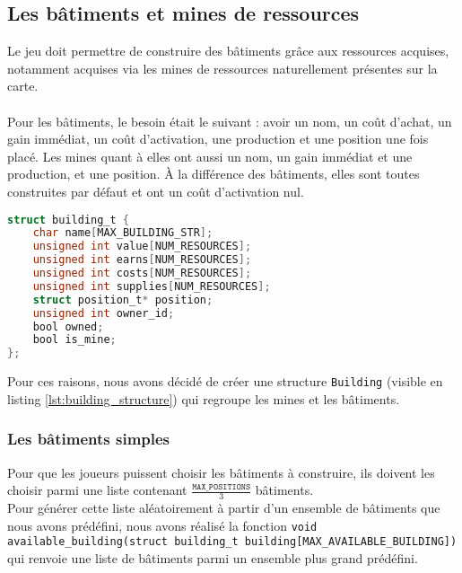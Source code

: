 \subsection*{Les bâtiments et mines de ressources}
Le jeu doit permettre de construire des bâtiments grâce aux ressources acquises, notamment acquises via les mines de ressources naturellement présentes sur la carte.\\ \\
Pour les bâtiments, le besoin était le suivant : avoir un nom, un coût d'achat, un gain immédiat, un coût d'activation, une production et une position une fois placé.
Les mines quant à elles ont aussi un nom, un gain immédiat et une production, et une position.
À la différence des bâtiments, elles sont toutes construites par défaut et ont un coût d'activation nul.
\begin{lstlisting}[language=C, backgroundcolor=\color{black!5}, frame=single, frameround=tttt, basicstyle=\ttfamily, breaklines=true, keywordstyle=\color{blue}, commentstyle=\color{green!50!black}, stringstyle=\color{red}]
struct building_t {
    char name[MAX_BUILDING_STR];
    unsigned int value[NUM_RESOURCES];
    unsigned int earns[NUM_RESOURCES];
    unsigned int costs[NUM_RESOURCES];
    unsigned int supplies[NUM_RESOURCES];
    struct position_t* position;
    unsigned int owner_id;
    bool owned;
    bool is_mine;
};
\end{lstlisting}
\vspace{-0.25cm}
\label{lst:building_structure}
\vspace{0.5cm}
Pour ces raisons, nous avons décidé de créer une structure \texttt{Building} (visible en listing \ref{lst:building_structure}) qui regroupe les mines et les bâtiments.
\subsubsection{Les bâtiments simples}
\label{sec:bat}
Pour que les joueurs puissent choisir les bâtiments à construire, ils doivent les choisir parmi une liste contenant \(\frac{\texttt{MAX\_POSITIONS}}{3}\) bâtiments.\\
Pour générer cette liste aléatoirement à partir d'un ensemble de bâtiments que nous avons prédéfini, nous avons réalisé la fonction \texttt{void available\_building(struct building\_t building[MAX\_AVAILABLE\_BUILDING])} qui renvoie une liste de bâtiments parmi un ensemble plus grand prédéfini.\\
